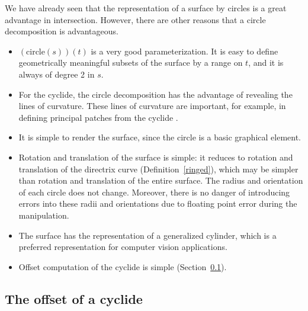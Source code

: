 We have already seen that the representation of a surface by circles
is a great advantage in intersection.
However, there are other reasons that a circle decomposition is advantageous.
\begin{itemize}
\item
	$(\mbox{circle}(s))(t)$ is a very good parameterization.
	It is easy to define geometrically meaningful subsets of 
	the surface by a range on $t$, and it is always of degree 2 in $s$.
\item
	For the cyclide, the circle decomposition has the advantage
	of revealing the lines of curvature.
	These lines of curvature are important, for example,
	in defining principal patches from the cyclide
	\cite{DEP84,MAR82,SHAR85}.
\item
	It is simple to render the surface, since the circle is a basic
	graphical element.
\item
	Rotation and translation of the surface is simple:
	it reduces to rotation and translation of the directrix curve
	(Definition~\ref{ringed}), which may be simpler
	than rotation and translation of the entire surface.
	The radius and orientation of each circle does not change.
	Moreover, there is no danger of introducing errors into these 
	radii and orientations due to floating point error 
	during the manipulation.
\item
	The surface has the representation of a generalized cylinder,
	which is a preferred representation for computer vision applications.
\item
	Offset computation of the cyclide is simple (Section~\ref{offset}).
\end{itemize}	


\subsection{The offset of a cyclide}
\label{offset}

